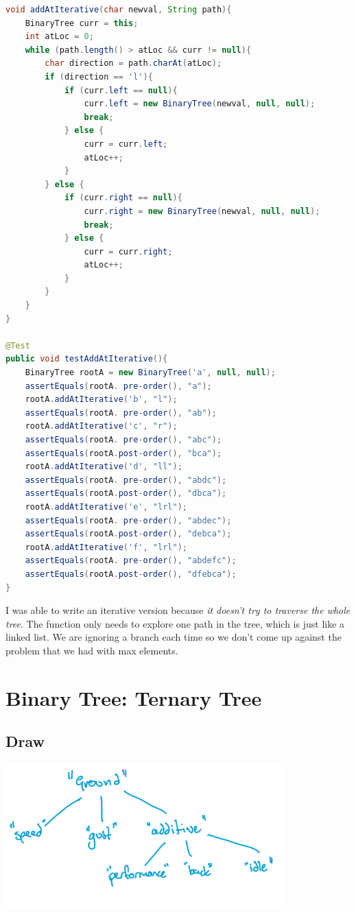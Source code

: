 \documentclass[twoside=false,DIV=14]{scrartcl}
\begin{document}
\begin{lstlisting}[language=java]
void addAtIterative(char newval, String path){
    BinaryTree curr = this;
    int atLoc = 0;
    while (path.length() > atLoc && curr != null){
        char direction = path.charAt(atLoc);
        if (direction == 'l'){
            if (curr.left == null){
                curr.left = new BinaryTree(newval, null, null);
                break;
            } else {
                curr = curr.left;
                atLoc++;
            }
        } else {
            if (curr.right == null){
                curr.right = new BinaryTree(newval, null, null);
                break;
            } else {
                curr = curr.right;
                atLoc++;
            }
        }
    }
}

@Test
public void testAddAtIterative(){
    BinaryTree rootA = new BinaryTree('a', null, null);
    assertEquals(rootA. pre-order(), "a");
    rootA.addAtIterative('b', "l");
    assertEquals(rootA. pre-order(), "ab");
    rootA.addAtIterative('c', "r");
    assertEquals(rootA. pre-order(), "abc");
    assertEquals(rootA.post-order(), "bca");
    rootA.addAtIterative('d', "ll");
    assertEquals(rootA. pre-order(), "abdc");
    assertEquals(rootA.post-order(), "dbca");
    rootA.addAtIterative('e', "lrl");
    assertEquals(rootA. pre-order(), "abdec");
    assertEquals(rootA.post-order(), "debca");
    rootA.addAtIterative('f', "lrl");
    assertEquals(rootA. pre-order(), "abdefc");
    assertEquals(rootA.post-order(), "dfebca");
}

\end{lstlisting}
I was able to write an iterative version because \emph{it doesn't try to traverse the whole tree}.  The function only needs to explore one path in the tree, which is just like a linked list.  We are ignoring a branch each time so we don't come up against the problem that we had with max elements.

\section{Binary Tree: Ternary Tree}
\subsection{Draw}
\includegraphics[width=0.8\textwidth]{ternary_tree.jpeg}
\end{document}
